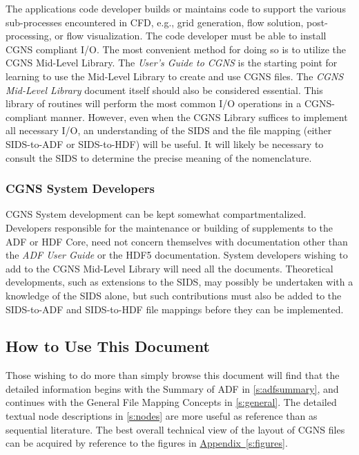 The applications code developer builds or maintains code to support the
various sub-processes encountered in CFD, e.g., grid generation, flow
solution, post-processing, or flow visualization. The code developer
must be able to install CGNS compliant I/O. The most convenient method
for doing so is to utilize the CGNS Mid-Level Library.
The \textit{User's Guide to CGNS} is the starting point for learning to
use the Mid-Level Library to create and use CGNS files.
The \textit{CGNS Mid-Level
Library} document itself should also be considered essential.
This library of routines will perform the most common I/O operations in
a CGNS-compliant manner.
However, even when the CGNS Library suffices to implement all necessary
I/O, an understanding of the SIDS and the file mapping (either
SIDS-to-ADF or SIDS-to-HDF) will be useful.
It will likely be necessary to consult the SIDS to determine the
precise meaning of the nomenclature.

\subsubsection{CGNS System Developers}

CGNS System development can be kept somewhat compartmentalized.
Developers responsible for the maintenance or building of supplements
to the ADF or HDF Core, need not concern themselves with documentation
other than the \textit{ADF User Guide} or the HDF5 documentation.
System developers wishing to add to the CGNS Mid-Level Library will need
all the documents.
Theoretical developments, such as extensions to the SIDS, may possibly
be undertaken with a knowledge of the SIDS alone, but such contributions
must also be added to the SIDS-to-ADF and SIDS-to-HDF file mappings
before they can be implemented.

\subsection{How to Use This Document}

Those wishing to do more than simply browse this document will
find that the detailed information begins with the Summary of ADF
in \autoref{s:adfsummary}, and continues with the General File
Mapping Concepts in \autoref{s:general}. The detailed textual node
descriptions in \autoref{s:nodes} are more useful as reference than
as sequential literature. The best overall technical view of the
layout of CGNS files can be acquired by reference to the figures in
\hyperref[s:figures]{Appendix~\ref*{s:figures}}.
